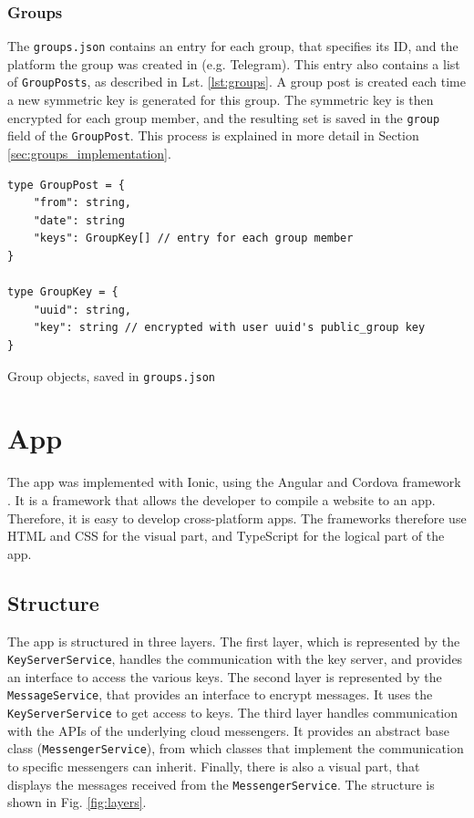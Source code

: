 \documentclass[a4paper, oneside]{discothesis}
\begin{document}
\subsubsection{Groups}
\label{sec:group_keys}

The \texttt{groups.json} contains an entry for each group, that specifies its ID, and the platform the group was created in (e.g. Telegram). This entry also contains a list of \texttt{GroupPosts}, as described in Lst. \ref{lst:groups}. A group post is created each time a new symmetric key is generated for this group. The symmetric key is then encrypted for each group member, and the resulting set is saved in the \texttt{group} field of the \texttt{GroupPost}. This process is explained in more detail in Section \ref{sec:groups_implementation}.

\begin{listing}[h!]
\begin{verbatim}
type GroupPost = {
    "from": string,
    "date": string
    "keys": GroupKey[] // entry for each group member
}

type GroupKey = {
    "uuid": string,
    "key": string // encrypted with user uuid's public_group key
}
\end{verbatim}
\caption{Group objects, saved in \texttt{groups.json}}
\label{lst:groups}
\end{listing}

\section{App}

The app was implemented with Ionic, using the Angular and Cordova framework \cite{Ionic}. It is a framework that allows the developer to compile a website to an app. Therefore, it is easy to develop cross-platform apps. The frameworks therefore use HTML and CSS for the visual part, and TypeScript for the logical part of the app.

\subsection{Structure}

The app is structured in three layers. The first layer, which is represented by the \texttt{KeyServerService}, handles the communication with the key server, and provides an interface to access the various keys. The second layer is represented by the \texttt{MessageService}, that provides an interface to encrypt messages. It uses the \texttt{KeyServerService} to get access to keys. The third layer handles communication with the APIs of the underlying cloud messengers. It provides an abstract base class (\texttt{MessengerService}), from which classes that implement the communication to specific messengers can inherit. Finally, there is also a visual part, that displays the messages received from the \texttt{MessengerService}. The structure is shown in Fig. \ref{fig:layers}.
\end{document}

